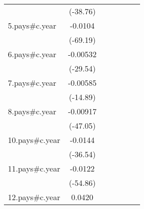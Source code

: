 {\begin{tabular}{l*{6}{c}}
                    &    (-38.76)         &                     &                     &                     &                     &                     \\
[1em]
5.pays#c.year       &     -0.0104\sym{***}&                     &                     &                     &                     &                     \\
                    &    (-69.19)         &                     &                     &                     &                     &                     \\
[1em]
6.pays#c.year       &    -0.00532\sym{***}&                     &                     &                     &                     &                     \\
                    &    (-29.54)         &                     &                     &                     &                     &                     \\
[1em]
7.pays#c.year       &    -0.00585\sym{***}&                     &                     &                     &                     &                     \\
                    &    (-14.89)         &                     &                     &                     &                     &                     \\
[1em]
8.pays#c.year       &    -0.00917\sym{***}&                     &                     &                     &                     &                     \\
                    &    (-47.05)         &                     &                     &                     &                     &                     \\
[1em]
10.pays#c.year      &     -0.0144\sym{***}&                     &                     &                     &                     &                     \\
                    &    (-36.54)         &                     &                     &                     &                     &                     \\
[1em]
11.pays#c.year      &     -0.0122\sym{***}&                     &                     &                     &                     &                     \\
                    &    (-54.86)         &                     &                     &                     &                     &                     \\
[1em]
12.pays#c.year      &      0.0420\sym{***}&                     &                     &                     &                     &                     \\

\end{tabular}}
